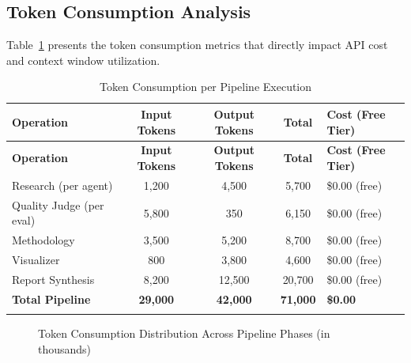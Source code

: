 \documentclass[a4paper,12pt,openany]{report}
\begin{document}
\subsection{Token Consumption Analysis}

Table~\ref{tab:tokens} presents the token consumption metrics that directly impact API cost and context window utilization.

\begin{longtable}{|p{2.5cm}|c|c|c|p{5.5cm}|}
\hline
\textbf{Operation} & \textbf{Input Tokens} & \textbf{Output Tokens} & \textbf{Total} & \textbf{Cost (Free Tier)} \\
\hline
\endfirsthead
\hline
\textbf{Operation} & \textbf{Input Tokens} & \textbf{Output Tokens} & \textbf{Total} & \textbf{Cost (Free Tier)} \\
\hline
\endhead
\hline
\endfoot
Research (per agent) & 1,200 & 4,500 & 5,700 & \$0.00 (free) \\
\hline
Quality Judge (per eval) & 5,800 & 350 & 6,150 & \$0.00 (free) \\
\hline
Methodology & 3,500 & 5,200 & 8,700 & \$0.00 (free) \\
\hline
Visualizer & 800 & 3,800 & 4,600 & \$0.00 (free) \\
\hline
Report Synthesis & 8,200 & 12,500 & 20,700 & \$0.00 (free) \\
\hline
\textbf{Total Pipeline} & \textbf{29,000} & \textbf{42,000} & \textbf{71,000} & \textbf{\$0.00} \\
\hline

\caption{Token Consumption per Pipeline Execution}
\label{tab:tokens}
\end{longtable}

\begin{figure}[H]
\centering
{}
\caption{Token Consumption Distribution Across Pipeline Phases (in thousands)}
\label{fig:token_dist}
\end{figure}
\end{document}
